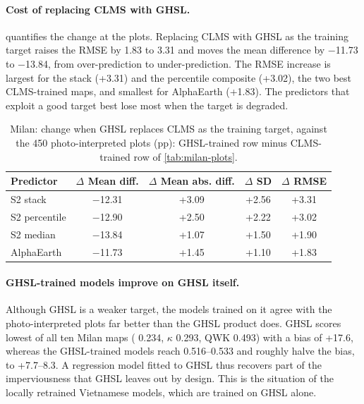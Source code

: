 \paragraph{Cost of replacing CLMS with GHSL.} 
quantifies the change at the plots. Replacing CLMS with GHSL as the training
target raises the RMSE by 1.83 to 3.31\pp{} and moves the mean difference by
$-$11.73 to $-$13.84\pp, from over-prediction to under-prediction. The RMSE
increase is largest for the stack (+3.31\pp) and the percentile composite
(+3.02\pp), the two best CLMS-trained maps, and smallest for AlphaEarth
(+1.83\pp). The predictors that exploit a good target best lose most when
the target is degraded.

\begin{table}[htbp]
  \centering
  \small
  \caption{Milan: change when GHSL replaces CLMS as the training target,
  against the 450 photo-interpreted plots (pp): GHSL-trained row minus
  CLMS-trained row of \cref{tab:milan-plots}.}
  \label{tab:target-change}
  \begin{tabular}{lcccc}
    \toprule
    Predictor & $\Delta$ Mean diff. & $\Delta$ Mean abs. diff. & $\Delta$ SD
      & $\Delta$ RMSE \\
    \midrule
    S2 stack      & $-$12.31 & +3.09 & +2.56 & +3.31 \\
    S2 percentile & $-$12.90 & +2.50 & +2.22 & +3.02 \\
    S2 median     & $-$13.84 & +1.07 & +1.50 & +1.90 \\
    AlphaEarth    & $-$11.73 & +1.45 & +1.10 & +1.83 \\
    \bottomrule
  \end{tabular}
\end{table}

\paragraph{GHSL-trained models improve on GHSL itself.} Although GHSL is a
weaker target, the models trained on it agree with the photo-interpreted
plots far better than the GHSL product does. GHSL scores lowest of all ten
Milan maps (\Rsq{} 0.234, $\kappa$ 0.293, QWK 0.493) with a bias of
+17.6\pp, whereas the GHSL-trained models reach \Rsq{} 0.516--0.533 and
roughly halve the bias, to +7.7--8.3\pp. A regression model fitted to GHSL
thus recovers part of the imperviousness that GHSL leaves out by design.
This is the situation of the locally retrained Vietnamese models, which
are trained on GHSL alone.


